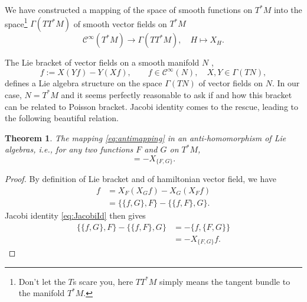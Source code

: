 \documentclass[english,fontsize=11pt,paper=b5]{scrbook}
\numberwithin{equation}{chapter}
\newtheorem{theorem}{Theorem}[chapter]
\theoremstyle{definition}
\begin{document}
    We have constructed a mapping of the space of smooth functions on $T^*M$ into the space\footnote{Don't let the $T$s scare you, here $TT^*M$ simply means the tangent bundle to the manifold $T^*M$.} ${\Gamma(TT^* M)}$ of smooth vector fields on $T^*M$
    \begin{equation}\label{eq:antimapping}
      \mathcal{C}^\infty (T^*M) \to \Gamma(TT^* M), \quad H \mapsto X_H.
    \end{equation}

    The Lie bracket of vector fields on a smooth manifold $N$ \cite{book:lee},
    \begin{equation}
      [X,Y] f := X(Y f) - Y(X f), \qquad f\in\mathcal{C}^\infty(N), \quad X,Y\in\Gamma(TN),
    \end{equation}
    defines a Lie algebra structure on the space $\Gamma(TN)$ of vector fields on $N$.
    In our case, $N = T^* M$ and it seems perfectly reasonable to ask if and how this bracket can be related to Poisson bracket.
    Jacobi identity comes to the rescue, leading to the following beautiful relation.

    \begin{theorem}\label{thm:antihom}
      The mapping \eqref{eq:antimapping} in an \emph{anti-homomorphism} of Lie algebras, i.e., for any two functions $F$ and $G$ on $T^*M$,
      \begin{equation}
        [X_{F}, X_{G}] = - X_{\big\{F, G\big\}}.
      \end{equation}
    \end{theorem}
    \begin{proof}
      By definition of Lie bracket and of hamiltonian vector field, we have
      \begin{align}
        [X_{F}, X_{G}] f & = X_{F}(X_{G} f) - X_{G}(X_{F} f)                                    \\
                         & = \big\{\big\{f, G\big\}, F\big\} - \big\{\big\{f, F\big\}, G\big\}.
      \end{align}
      Jacobi identity \eqref{eq:JacobiId} then gives
      \begin{align}
        \big\{\big\{f, G\big\}, F\big\} - \big\{\big\{f, F\big\}, G\big\} & = - \big\{f,\big\{F,G\big\}\big\} \\
                                                                          & = - X_{\big\{F, G\big\}} f.
      \end{align}
    \end{proof}
\end{document}
